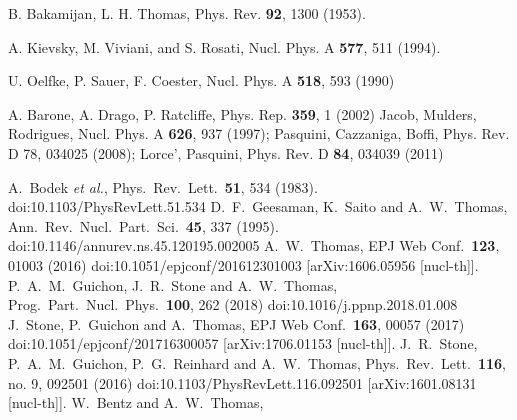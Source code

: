 \documentclass[twocolumn]{revtex4}
\begin{document}
\begin{thebibliography}{25}
 B. Bakamijan, L. H. Thomas, Phys. Rev. {\bf 92}, 1300 (1953).

 A. Kievsky, M. Viviani,  and S.
Rosati, Nucl. Phys. A {\bf 577}, 511 (1994).

 U. Oelfke, P. Sauer, F. Coester, Nucl. Phys. A {\bf 518}, 593 (1990)

 A. Barone, A. Drago, P. Ratcliffe, Phys. Rep. {\bf 359}, 1 (2002)
  Jacob,  Mulders, Rodrigues, Nucl. Phys.  A {\bf 626}, 937 (1997);
 Pasquini,  Cazzaniga, Boffi, Phys. Rev. D 78, 034025 (2008); Lorce', Pasquini, Phys. Rev. D {\bf 84}, 034039 (2011)

%

  A.~Bodek {\it et al.},
  Phys.\ Rev.\ Lett.\  {\bf 51}, 534 (1983).
  doi:10.1103/PhysRevLett.51.534
%
  D.~F.~Geesaman, K.~Saito and A.~W.~Thomas,
  Ann.\ Rev.\ Nucl.\ Part.\ Sci.\  {\bf 45}, 337 (1995).
  doi:10.1146/annurev.ns.45.120195.002005
%
  A.~W.~Thomas,
  EPJ Web Conf.\  {\bf 123}, 01003 (2016)
  doi:10.1051/epjconf/201612301003
  [arXiv:1606.05956 [nucl-th]].
%
  P.~A.~M.~Guichon, J.~R.~Stone and A.~W.~Thomas,
  Prog.\ Part.\ Nucl.\ Phys.\  {\bf 100}, 262 (2018)
  doi:10.1016/j.ppnp.2018.01.008
%
  J.~Stone, P.~Guichon and A.~Thomas,
  EPJ Web Conf.\  {\bf 163}, 00057 (2017)
  doi:10.1051/epjconf/201716300057
  [arXiv:1706.01153 [nucl-th]].
%
  J.~R.~Stone, P.~A.~M.~Guichon, P.~G.~Reinhard and A.~W.~Thomas,
  Phys.\ Rev.\ Lett.\  {\bf 116}, no. 9, 092501 (2016)
  doi:10.1103/PhysRevLett.116.092501
  [arXiv:1601.08131 [nucl-th]].
%
  W.~Bentz and A.~W.~Thomas,

\end{thebibliography}
\end{document}
